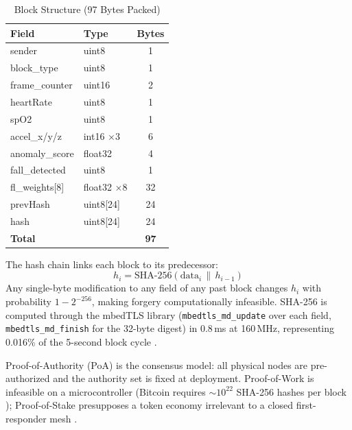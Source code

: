 \documentclass[journal]{IEEEtran}
\begin{document}
\begin{table}[t]
\centering
\caption{Block Structure (97 Bytes Packed)}
\label{tab:block}
\renewcommand{\arraystretch}{1.15}
\begin{tabular}{llc}
\toprule
\textbf{Field}   & \textbf{Type}    & \textbf{Bytes} \\
\midrule
sender           & uint8            & 1  \\
block\_type      & uint8            & 1  \\
frame\_counter   & uint16           & 2  \\
heartRate        & uint8            & 1  \\
spO2             & uint8            & 1  \\
accel\_x/y/z     & int16 $\times$3  & 6  \\
anomaly\_score   & float32          & 4  \\
fall\_detected   & uint8            & 1  \\
fl\_weights[8]   & float32 $\times$8 & 32 \\
prevHash         & uint8[24]        & 24 \\
hash             & uint8[24]        & 24 \\
\midrule
\textbf{Total}   &                  & \textbf{97} \\
\bottomrule
\end{tabular}
\end{table}

The hash chain links each block to its predecessor:
\begin{equation}
h_i = \text{SHA-256}(\text{data}_i \,\|\, h_{i-1})
\label{eq:chain}
\end{equation}
Any single-byte modification to any field of any past block changes $h_i$
with probability $1 - 2^{-256}$, making forgery computationally
infeasible. SHA-256 is computed through the mbedTLS library
(\texttt{mbedtls\_md\_update} over each field, \texttt{mbedtls\_md\_finish}
for the 32-byte digest) in 0.8\,ms at 160\,MHz, representing 0.016\% of
the 5-second block cycle \cite{mbedTLS2023}.

Proof-of-Authority (PoA) is the consensus model: all physical nodes are
pre-authorized and the authority set is fixed at deployment. Proof-of-Work
is infeasible on a microcontroller (Bitcoin requires $\sim$$10^{22}$
SHA-256 hashes per block \cite{Nakamoto2008}); Proof-of-Stake presupposes
a token economy irrelevant to a closed first-responder mesh \cite{Puthal2018}.
\end{document}
